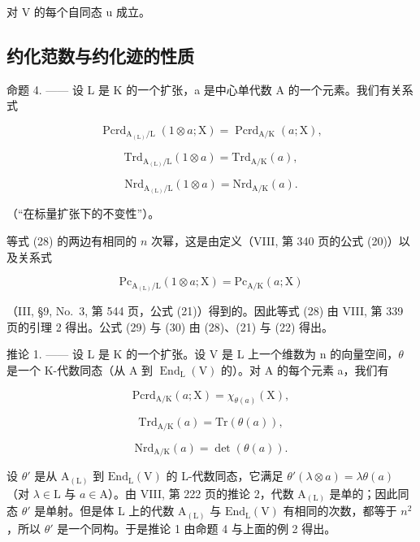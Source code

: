 对 V 的每个自同态 u 成立。

\subsection{约化范数与约化迹的性质}

命题 4. —— 设 L 是 K 的一个扩张，a 是中心单代数 A 的一个元素。我们有关系式

\[
\operatorname{Pcrd} _ {\mathrm{A} _ {(\mathrm{L})} / \mathrm{L}} (1 \otimes a; \mathrm{X}) = \operatorname{Pcrd} _ {\mathrm{A} / \mathrm{K}} (a; \mathrm{X}),\tag{28}
\]

\[
\mathrm{Trd} _ {\mathrm{A} _ {(\mathrm{L})} / \mathrm{L}} (1 \otimes a) = \mathrm{Trd} _ {\mathrm{A} / \mathrm{K}} (a),\tag{29}
\]

\[
\mathrm{Nrd} _ {\mathrm{A} _ {(\mathrm{L})} / \mathrm{L}} (1 \otimes a) = \mathrm{Nrd} _ {\mathrm{A} / \mathrm{K}} (a).\tag{30}
\]

（``在标量扩张下的不变性''）。

等式 (28) 的两边有相同的 \(n\) 次幂，这是由定义（VIII, 第 340 页的公式 (20)）以及关系式

\[
\mathrm{Pc} _ {\mathrm{A} _ {(\mathrm{L})} / \mathrm{L}} (1 \otimes a; \mathrm{X}) = \mathrm{Pc} _ {\mathrm{A} / \mathrm{K}} (a; \mathrm{X})
\]

（III, §9, No.~3, 第 544 页，公式 (21)）得到的。因此等式 (28) 由 VIII, 第 339 页的引理 2 得出。公式 (29) 与 (30) 由 (28)、(21) 与 (22) 得出。

推论 1. —— 设 L 是 K 的一个扩张。设 V 是 L 上一个维数为 n 的向量空间，\(\theta\) 是一个 K-代数同态（从 A 到 \(\operatorname{End}_{\mathrm{L}}(\mathrm{V})\) 的）。对 A 的每个元素 a，我们有

\[
\mathrm{Pcrd} _ {\mathrm{A/K}} (a; \mathrm{X}) = \chi_ {\theta (a)} (\mathrm{X}),\tag{31}
\]

\[
\mathrm{Trd} _ {\mathrm{A/K}} (a) = \mathrm{Tr} (\theta (a)),\tag{32}
\]

\[
\mathrm{Nrd} _ {\mathrm{A/K}} (a) = \det (\theta (a)).\tag{33}
\]

设 \(\theta'\) 是从 \(\mathrm{A}_{(\mathrm{L})}\) 到 \(\mathrm{End}_{\mathrm{L}}(\mathrm{V})\) 的 L-代数同态，它满足 \(\theta'(\lambda \otimes a) = \lambda \theta(a)\)（对 \(\lambda \in \mathrm{L}\) 与 \(a \in \mathrm{A}\)）。由 VIII, 第 222 页的推论 2，代数 \(\mathrm{A}_{(\mathrm{L})}\) 是单的；因此同态 \(\theta'\) 是单射。但是体 L 上的代数 \(\mathrm{A}_{(\mathrm{L})}\) 与 \(\mathrm{End}_{\mathrm{L}}(\mathrm{V})\) 有相同的次数，都等于 \(n^2\)，所以 \(\theta'\) 是一个同构。于是推论 1 由命题 4 与上面的例 2 得出。

